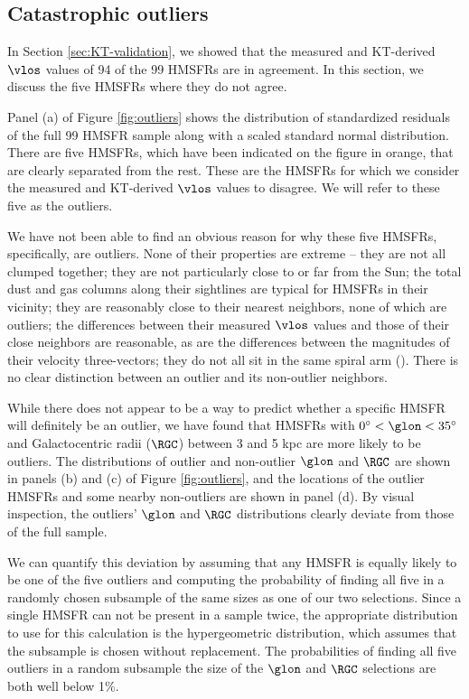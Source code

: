\subsection{Catastrophic outliers}
\label{sec:discussion-catastrophic}
In Section \ref{sec:KT-validation}, we showed that the measured and KT-derived $\vlos$ values of 94 of the 99 \Reid HMSFRs are in agreement. 
In this section, we discuss the five HMSFRs where they do not agree.

Panel (a) of Figure \ref{fig:outliers} shows the distribution of standardized residuals of the full 99 HMSFR sample along with a scaled standard normal distribution.
There are five HMSFRs, which have been indicated on the figure in orange, that are clearly separated from the rest. 
These are the HMSFRs for which we consider the measured and KT-derived $\vlos$ values to disagree.
We will refer to these five as the outliers.

We have not been able to find an obvious reason for why these five HMSFRs, specifically, are outliers. 
None of their properties are extreme -- they are not all clumped together; they are not particularly close to or far from the Sun; the total dust and gas columns along their sightlines are typical for HMSFRs in their vicinity; they are reasonably close to their nearest neighbors, none of which are outliers; the differences between their measured $\vlos$ values and those of their close neighbors are reasonable, as are the differences between the magnitudes of their velocity three-vectors; they do not all sit in the same spiral arm (\Reid). 
There is no clear distinction between an outlier and its non-outlier neighbors. 

While there does not appear to be a way to predict whether a specific HMSFR will definitely be an outlier, we have found that HMSFRs with $0^\circ < \glon < 35^\circ$ and Galactocentric radii ($\RGC$) between 3 and 5 kpc are more likely to be outliers. 
The distributions of outlier and non-outlier $\glon$ and $\RGC$ are shown in panels (b) and (c) of Figure \ref{fig:outliers}, and the locations of the outlier HMSFRs and some nearby non-outliers are shown in panel (d).
By visual inspection, the outliers' $\glon$ and $\RGC$ distributions clearly deviate from those of the full sample.

We can quantify this deviation by assuming that any HMSFR is equally likely to be one of the five outliers and computing the probability of finding all five in a randomly chosen subsample of the same sizes as one of our two selections.
Since a single HMSFR can not be present in a sample twice, the appropriate distribution to use for this calculation is the hypergeometric distribution, which assumes that the subsample is chosen without replacement.
The probabilities of finding all five outliers in a random subsample the size of the $\glon$ and $\RGC$ selections are both well below 1\%.

